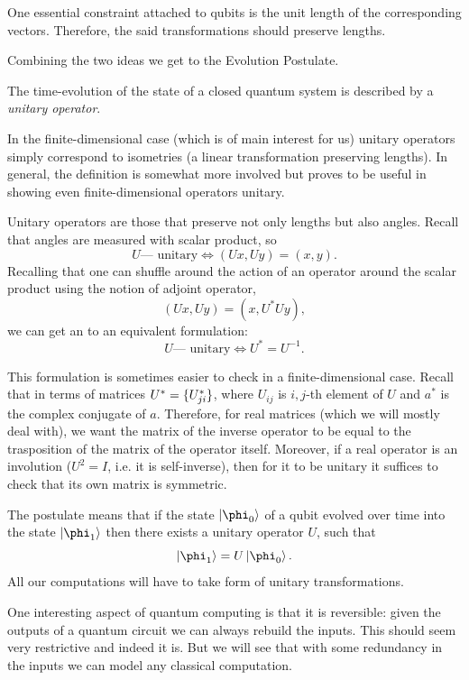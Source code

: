 \documentclass{article}
\begin{document}
One essential constraint attached to qubits is the unit length of the 
corresponding vectors. Therefore, the said transformations should
preserve lengths.

Combining the two ideas we get to the Evolution Postulate.


\begin{post}
The time-evolution of the state of a closed quantum system is described
by a \emph{unitary operator}.
\end{post}

In the finite-dimensional case (which is of main interest for us) unitary
operators simply correspond to isometries (a linear transformation 
preserving lengths). In general, the definition is somewhat more involved 
but proves to be useful in showing even finite-dimensional operators unitary.

Unitary operators are those that preserve not only lengths but also angles.
Recall that angles are measured with scalar product, so
\[
  U \text{— unitary} \Leftrightarrow (Ux,Uy) = (x,y).
\]
Recalling that one can shuffle around the action of an operator around the
scalar product using the notion of adjoint operator, 
\[
  (Ux,Uy) = (x,U^*Uy),
\]
we can get an to an equivalent formulation:
\[
  U \text{— unitary} \Leftrightarrow U^*=U^{-1}.
\]

This formulation is sometimes easier to check in a finite-dimensional 
case. Recall that in terms of matrices $U^* = \{U_{ji}^*\}$, 
where $U_{ij}$ is $i,j$-th element of $U$ and $a^*$ is the complex 
conjugate of $a$. Therefore, for real matrices (which we will mostly deal with),
we want the matrix of the inverse operator to be equal to the trasposition of
the matrix of the operator itself. Moreover, if a real operator is an involution
($U^2=I$, i.e. it is self-inverse), then for it to be unitary it suffices to
check that its own matrix is symmetric.

The postulate means that if the state $\ket{\phi_0}$ of a qubit evolved over 
time into the state $\ket{\phi_1}$ then there exists a unitary operator $U$, such
that
\[
  \ket{\phi_1} = U \ket{\phi_0}.
\]
All our computations will have to take form of unitary transformations.

One interesting aspect of quantum computing is that it is reversible: given 
the outputs of a quantum circuit we can always rebuild the inputs. This 
should seem very restrictive and indeed it is. But we will see that with
some redundancy in the inputs we can model any classical computation.
\end{document}
